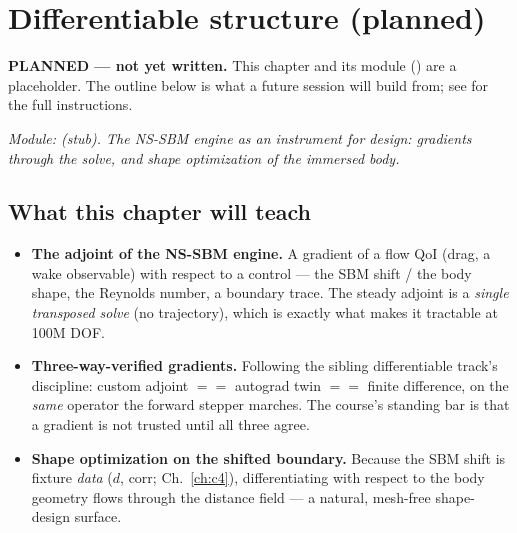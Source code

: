 \chapter{Differentiable structure (planned)}
\label{ch:c8}

\begin{keybox}\textbf{PLANNED --- not yet written.} This chapter and its
module () are a placeholder. The
outline below is what a future session will build from; see
 for the full instructions.\end{keybox}

\emph{Module:  (stub). The NS-SBM
engine as an instrument for design: gradients through the solve, and shape
optimization of the immersed body.}

\section*{What this chapter will teach}
\begin{itemize}
\item \textbf{The adjoint of the NS-SBM engine.} A gradient of a flow QoI
  (drag, a wake observable) with respect to a control --- the SBM shift /
  the body shape, the Reynolds number, a boundary trace. The steady adjoint
  is a \emph{single transposed solve} (no trajectory), which is exactly what
  makes it tractable at 100M DOF.
\item \textbf{Three-way-verified gradients.} Following the sibling
  differentiable track's discipline: custom adjoint $==$ autograd twin $==$
  finite difference, on the \emph{same} operator the forward stepper
  marches. The course's standing bar is that a gradient is not trusted
  until all three agree.
\item \textbf{Shape optimization on the shifted boundary.} Because the SBM
  shift is fixture \emph{data} ($d$, $\text{corr}$; Ch.~\ref{ch:c4}),
  differentiating with respect to the body geometry flows through the
  distance field --- a natural, mesh-free shape-design surface.
\end{itemize}

